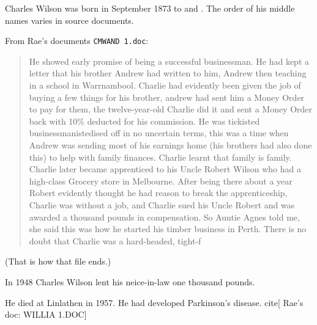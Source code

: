 
Charles Wilson was born in September 1873 to  and .
The order of his middle names varies in source documents.

From Rae's documents \texttt{CMWAND 1.doc}:

\begin{quotation}
He showed early promise of being a successful businessman.
He had kept a letter that his brother Andrew had written to him, Andrew then teaching in a school in Warrnambool.
Charlie had evidently been given the job of buying a few things for his brother, andrew had sent him a Money Order to pay for them,
the twelve-year-old Charlie did it and sent a Money Order back with 10\% deducted for his commission.
He was tickisted businessmanistedised off in no uncertain terms, this was a time when Andrew was sending most of his earnings home
(his brothers had also done this) to help with family finances. Charlie learnt that family is family. Charlie later became apprenticed to his Uncle Robert Wilson who had a high-class Grocery store in Melbourne. After being there about a year Robert evidently thought he had reason to break the apprenticeship, Charlie was without a job, and Charlie sued his Uncle Robert and was awarded a thousand pounds in compensation. So Auntie Agnes told me, she said this was how he started his timber business in Perth. There is no doubt that Charlie was a hard-headed, tight-f
\end{quotation}

(That is how that file ends.)

In 1948 Charles Wilson lent his neice-in-law  one thousand pounds.

He died at Linlathen in 1957. He had developed Parkinson’s disease. cite[ Rae's doc: WILLIA 1.DOC]
